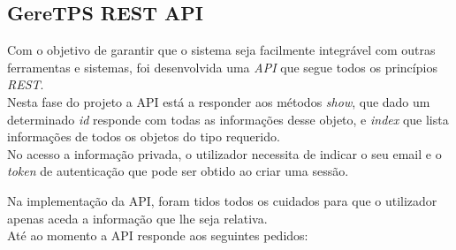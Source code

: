 \subsection{GereTPS REST API}

Com o objetivo de garantir que o sistema seja facilmente integrável com outras ferramentas e sistemas, foi desenvolvida uma \textit{API} que segue todos os princípios \textit{REST}.\\

Nesta fase do projeto a API está a responder aos métodos \textit{show}, que dado um determinado \textit{id} responde com todas as informações desse objeto, e \textit{index} que lista informações de todos os objetos do tipo requerido.\\

No acesso a informação privada, o utilizador necessita de indicar o seu email e o \textit{token} de autenticação que pode ser obtido ao criar uma sessão.

Na implementação da API, foram tidos todos os cuidados para que o utilizador apenas aceda a informação que lhe seja relativa. \\

Até ao momento a API responde aos seguintes pedidos:

